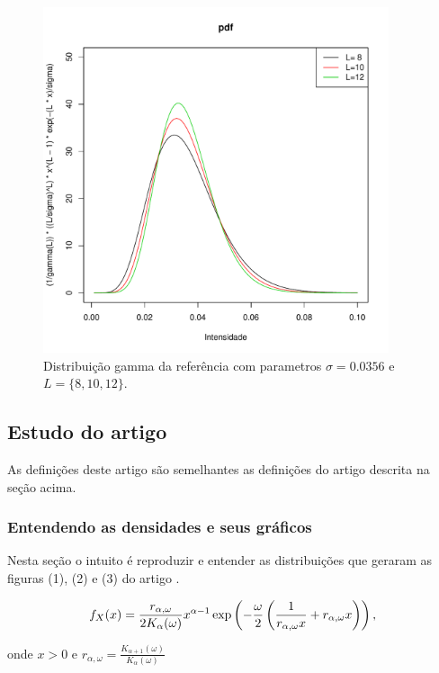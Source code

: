 \documentclass[12pt,a4paper]{article}
\begin{document}
\begin{figure}[hbt]
\centering
\includegraphics[width=4.0in]{fig_1_anfinsen_2009.pdf}
	\caption{Distribuição gamma da referência \cite{anfinsen2009} com parametros $\sigma=0.0356$ e $L=\{8,10,12\}$.}
\label{fig3}
\end{figure}

\subsection{Estudo do artigo  \cite{freitas_frery_2005}}

As definições deste artigo são semelhantes as definições do artigo \cite{anfinsen2009} descrita na seção acima. 

\subsubsection{ Entendendo as densidades e seus gráficos}

Nesta seção o intuito é reproduzir e entender as distribuições que geraram as figuras (1), (2) e (3) do artigo \cite{freitas_frery_2005}. 

\begin{equation}\label{eqn99}
	f_{X}(x)=\frac{r_{\alpha,\omega}}{2K_{\alpha}(\omega)}x^{\alpha-1}\exp\left(-\frac{\omega}{2}\left(\frac{1}{r_{\alpha,\omega}x}+ r_{\alpha,\omega}x\right)\right), \\
\end{equation}

onde $x>0$  e $r_{\alpha,\omega}=\frac{K_{\alpha+1}(\omega)}{K_{\alpha}(\omega)}$
\end{document}
